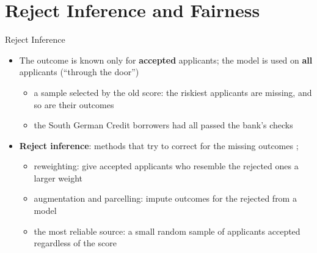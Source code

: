 \section{Reject Inference and Fairness}

\begin{frame}{Reject Inference}
\itemsize{\small}
\begin{itemize}
    \item The outcome is known only for \textbf{accepted} applicants; the model is used on \textbf{all} applicants (``through the door'')
    \begin{itemize}
        \item a sample selected by the old score: the riskiest applicants are missing, and so are their outcomes
        \item the South German Credit borrowers had all passed the bank's checks 
    \end{itemize}
    \item \textbf{Reject inference}: methods that try to correct for the missing outcomes ; 
    \begin{itemize}
        \item reweighting: give accepted applicants who resemble the rejected ones a larger weight
        \item augmentation and parcelling: impute outcomes for the rejected from a model
        \item the most reliable source: a small random sample of applicants accepted regardless of the score
    \end{itemize}
\end{itemize}
\end{frame}

